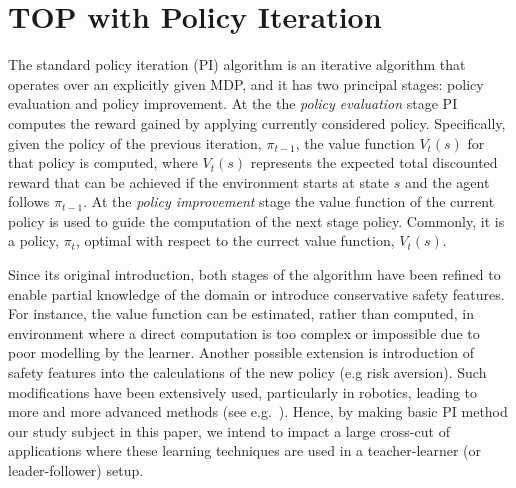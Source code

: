 
\section{TOP with Policy Iteration}\label{sec: TOP-PI}
The standard policy iteration (PI) algorithm is an iterative algorithm
that operates over an explicitly given MDP\cite{puterman_book_94}, and
it has two principal stages: policy evaluation and policy
improvement. At the the {\em policy evaluation} stage PI computes the
reward gained by applying currently considered policy. Specifically,
given the policy of the previous iteration, $\pi_{t-1}$, the value
function $V_t(s)$ for that policy is computed, where $V_t(s)$
represents the expected total discounted reward that can be achieved
if the environment starts at state $s$ and the agent follows
$\pi_{t-1}$. At the {\em policy improvement} stage the value function
of the current policy is used to guide the computation of the next
stage policy. Commonly, it is a policy, $\pi_{t}$, optimal with respect to the currect value function, $V_t(s)$.

Since its original introduction, both stages of the algorithm have
been refined to enable partial knowledge of the domain or introduce
conservative safety features. For instance, the value function can be
estimated, rather than computed, in environment where a direct
computation is too complex or impossible due to poor modelling by the
learner. Another possible extension is introduction of safety features
into the calculations of the new policy (e.g risk aversion). Such
modifications have been extensively used, particularly in robotics,
leading to more and more advanced methods (see
e.g.~\cite{sugiyama_et_al_2009}). Hence, by making basic PI method our
study subject in this paper, we intend to impact a large cross-cut of
applications where these learning techniques are used in a
teacher-learner (or leader-follower) setup.

